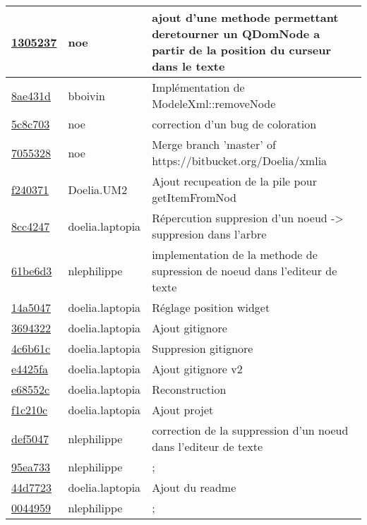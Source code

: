 \begin{tabular}{l l l}
\href{13052374e5f95c88e6464984197f44172199203c}{1305237} & noe & ajout d'une methode permettant deretourner un QDomNode a partir de la position du curseur dans le texte\\\hline
\href{8ae431dd8b13e15309ccd50bb7a9c472ec0e03f1}{8ae431d} & bboivin & Implémentation de ModeleXml::removeNode\\\hline
\href{5c8c703266d1fc13bf16e974fdd35ba89e3f8153}{5c8c703} & noe & correction d'un bug de coloration\\\hline
\href{7055328a51b244ebbf3e2951beda24c6656cd348}{7055328} & noe & Merge branch 'master' of https://bitbucket.org/Doelia/xmlia\\\hline
\href{f2403711975ef00aaf7a6baa3ba6777c1deb00ca}{f240371} & Doelia.UM2 & Ajout recupeation de la pile pour getItemFromNod\\\hline
\href{8cc424764644ec90aab305d91e746e661be0673b}{8cc4247} & doelia.laptopia & Répercution suppresion d'un noeud -> suppresion dans l'arbre\\\hline
\href{61be6d370c6022864230152546762af1db37b5f6}{61be6d3} & nlephilippe & implementation de la methode de supression de noeud dans l'editeur de texte\\\hline
\href{14a5047440a9f1aa861603d42a8d0a1d47dced39}{14a5047} & doelia.laptopia & Réglage position widget\\\hline
\href{36943220bf89cfd0e6db70dd327839a2753c7d04}{3694322} & doelia.laptopia & Ajout gitignore\\\hline
\href{4c6b61cf671a9a1a1402e2d0861682a1ea6c3518}{4c6b61c} & doelia.laptopia & Suppresion gitignore\\\hline
\href{e4425fa9bdd78a4263474fde6c8ff70af8f91878}{e4425fa} & doelia.laptopia & Ajout gitignore v2\\\hline
\href{e68552c46e3e8d7f8f7c9f9cc8bc1ad18d185419}{e68552c} & doelia.laptopia & Reconstruction\\\hline
\href{f1c210c428da6c3770e681c05457f984d62e6cde}{f1c210c} & doelia.laptopia & Ajout projet\\\hline
\href{def504782dfa57e67a09d30ddcfacf54aa61e0ec}{def5047} & nlephilippe & correction de la suppression d'un noeud dans l'editeur de texte\\\hline
\href{95ea733121f701d34e667b00d493df8c641efeeb}{95ea733} & nlephilippe & ;\\\hline
\href{44d7723a0fde942094870139795bcab6216ce46f}{44d7723} & doelia.laptopia & Ajout du readme\\\hline
\href{0044959e2f1fdf32643a7b0618b2d9887c45c56a}{0044959} & nlephilippe & ;\\\hline

\end{tabular}
